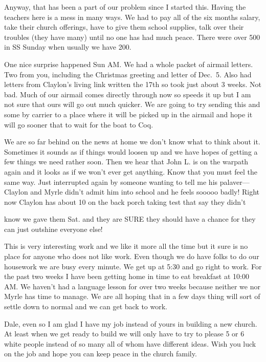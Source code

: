 \documentclass[
]{book}
\begin{document}
Anyway, that has been a part of our problem since I started this. Having the teachers here is a mess in many ways. We had to pay all of the six months salary, take their church offerings, have to give them school supplies, talk over their troubles (they have many) until no one has had much peace. There were over 500 in SS Sunday when usually we have 200.

One nice surprise happened Sun AM. We had a whole packet of airmail letters. Two from you, including the Christmas greeting and letter of Dec.~5. Also had letters from Claylon's living link written the 17th so took just about 3 weeks. Not bad. Much of our airmail comes directly through now so speeds it up but I am not sure that ours will go out much quicker. We are going to try sending this and some by carrier to a place where it will be picked up in the airmail and hope it will go sooner that to wait for the boat to Coq.

We are so far behind on the news at home we don't know what to think about it. Sometimes it sounds as if things would loosen up and we have hopes of getting a few things we need rather soon. Then we hear that John L. is on the warpath again and it looks as if we won't ever get anything. Know that you must feel the same way. Just interrupted again by someone wanting to tell me his palaver---Claylon and Myrle didn't admit him into school and he feels sooooo badly! Right now Claylon has about 10 on the back porch taking test that say they didn't

know we gave them Sat. and they are SURE they should have a chance for they can just outshine everyone else!

This is very interesting work and we like it more all the time but it sure is no place for anyone who does not like work. Even though we do have folks to do our housework we are busy every minute. We get up at 5:30 and go right to work. For the past two weeks I have been getting home in time to eat breakfast at 10:00 AM. We haven't had a language lesson for over two weeks because neither we nor Myrle has time to manage. We are all hoping that in a few days thing will sort of settle down to normal and we can get back to work.

Dale, even so I am glad I have my job instead of yours in building a new church. At least when we get ready to build we will only have to try to please 5 or 6 white people instead of so many all of whom have different ideas. Wish you luck on the job and hope you can keep peace in the church family.
\end{document}

